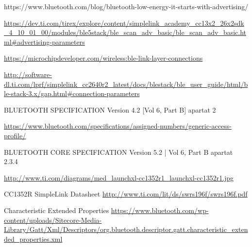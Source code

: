 \begin{thebibliography}{2}
https://www.bluetooth.com/blog/bluetooth-low-energy-it-starts-with-advertising/

\href{https://dev.ti.com/tirex/explore/content/simplelink\_academy\_cc13x2\_26x2sdk\_4\_10\_01\_00/modules/ble5stack/ble\_scan\_adv\_basic/ble\_scan\_adv\_basic.html\#advertising-parameter}{https://dev.ti.com/tirex/explore/content/simplelink\_academy\_cc13x2\_26x2sdk\_4\_10\_01\_00/modules/ble5stack/ble\_scan\_adv\_basic/ble\_scan\_adv\_basic.html\#advertising-parameters}

\href{https://microchipdeveloper.com/wireless:ble-link-layer-connections}{https://microchipdeveloper.com/wireless:ble-link-layer-connections}

\href{http://software-dl.ti.com/lprf/simplelink\_cc2640r2\_latest/docs/blestack/ble\_user\_guide/html/ble-stack-3.x/gap.html\#connection-parameters}{http://software-dl.ti.com/lprf/simplelink\_cc2640r2\_latest/docs/blestack/ble\_user\_guide/html/ble-stack-3.x/gap.html\#connection-parameters}

BLUETOOTH SPECIFICATION Version 4.2 [Vol 6, Part B] apartat 2

\href{https://www.bluetooth.com/specifications/assigned-numbers/generic-access-profile/}{https://www.bluetooth.com/specifications/assigned-numbers/generic-access-profile/}

BLUETOOTH CORE SPECIFICATION Version 5.2 | Vol 6, Part B apartat 2.3.4

\href{http://www.ti.com/diagrams/med_launchxl-cc1352r1_launchxl-cc1352r1.jpg}{http://www.ti.com/diagrams/med\_launchxl-cc1352r1\_launchxl-cc1352r1.jpg}

CC1352R SimpleLink Datasheet\newline
\href{http://www.ti.com/lit/ds/swrs196f/swrs196f.pdf}{http://www.ti.com/lit/ds/swrs196f/swrs196f.pdf}

Characteristic Extended Properties\newline
\href{https://www.bluetooth.com/wp-content/uploads/Sitecore-Media-Library/Gatt/Xml/Descriptors/org.bluetooth.descriptor.gatt.characteristic_extended_properties.xml}{https://www.bluetooth.com/wp-content/uploads/Sitecore-Media-Library/Gatt/Xml/Descriptors/org.bluetooth.descriptor.gatt.characteristic\_extended\_properties.xml}


\end{thebibliography}
